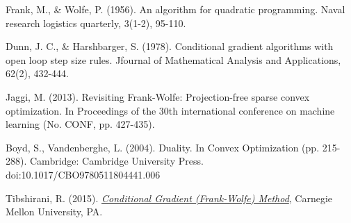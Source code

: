 \documentclass[12pt]{article}
\begin{document}
\begin{thebibliography}{}
 Frank, M., \& Wolfe, P. (1956). An algorithm for quadratic programming. Naval research logistics quarterly, 3(1-2), 95-110.

 Dunn, J. C., \& Harshbarger, S. (1978). Conditional gradient algorithms with open loop step size rules. Jfournal of Mathematical Analysis and Applications, 62(2), 432-444.

 Jaggi, M. (2013). Revisiting Frank-Wolfe: Projection-free sparse convex optimization. In Proceedings of the 30th international conference on machine learning (No. CONF, pp. 427-435).

 Boyd, S., Vandenberghe, L. (2004). Duality. In Convex Optimization (pp. 215-288). Cambridge: Cambridge University Press. doi:10.1017/CBO9780511804441.006


 Tibshirani, R. (2015). \href{http://www.stat.cmu.edu/~ryantibs/convexopt-S15/lectures/23-cond-grad.pdf}{\textit{Conditional Gradient (Frank-Wolfe) Method}}, Carnegie Mellon University, PA.

\end{thebibliography}

 
\end{document}
